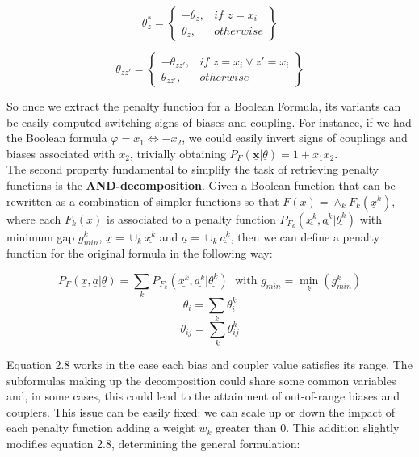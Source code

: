 \begin{equation}
    \theta_z^* = 
    \left\{
        \begin{array}{lr}
            -\theta_z, & \textit{if }z = x_i \\
            \theta_z, & otherwise
        \end{array}
    \right\}
\end{equation}

\begin{equation}
    \theta_{zz'} = 
    \left\{
        \begin{array}{lr}
            -\theta_{zz'}, & \textit{if }z = x_i \vee z' = x_i\\
            \theta_{zz'}, & otherwise
        \end{array}
    \right\}
\end{equation}


So once we extract the penalty function for a Boolean Formula, its variants can be easily computed switching signs of biases and coupling. For instance, if we had the Boolean formula $\varphi = x_1 \iff -x_2$, we could easily invert signs of couplings and biases associated with $x_2$, trivially obtaining $P_F(\underline{\textbf{x}} | \underline{\theta}) = 1 + x_1x_2$. \\
The second property fundamental to simplify the task of retrieving penalty functions is the \textbf{AND-decomposition}. Given a Boolean function that can be rewritten as a combination of simpler functions so that $F(x) = \land_k F_k(\underline{x}^k)$, where each $F_k(x)$ is associated to a penalty function $P_{F_k}(\underline{x^k},\underline{a^k}|\underline{\theta^k})$ with minimum gap $g^k_{min}$, $\underline{x} = \cup_k \underline{x^k}$ and $\underline{a} = \cup_k \underline{a^k}$, then we can define a penalty function for the original formula in the following way:

\begin{equation*}
    P_{F}(\underline{x},\underline{a}|\underline{\theta}) = \sum_k P_{F_k}(\underline{x^k},\underline{a^k}|\underline{\theta^k}) \; \textrm{        with        } g_{min} = \min_k(g^k_{min})
\end{equation*}
\begin{equation}
    \theta_i = \sum_k \theta^k_i
\end{equation}
\begin{equation*}
    \theta_{ij} = \sum_k \theta^k_{ij}
\end{equation*}

Equation 2.8 works in the case each bias and coupler value satisfies its range. The subformulas making up the decomposition could share some common variables and, in some cases, this could lead to the attainment of out-of-range biases and couplers. This issue can be easily fixed: we can scale up or down the impact of each penalty function adding a weight $w_k$ greater than 0. This addition slightly modifies equation 2.8, determining the general formulation:

